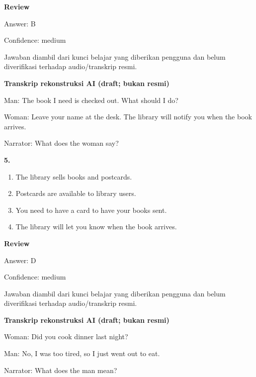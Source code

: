 \documentclass[12pt]{article}
\begin{document}
\par
\begingroup
\setlength{\parskip}{0pt}
\setlength{\parindent}{0pt}
\textbf{Review}\par
Answer: B\par
Confidence: medium\par
Jawaban diambil dari kunci belajar yang diberikan pengguna dan belum diverifikasi terhadap audio/transkrip resmi.\par
\endgroup
\par
\vspace{0.25\baselineskip}
\begin{exampleblock}
\textbf{Transkrip rekonstruksi AI (draft; bukan resmi)}\par
Man: The book I need is checked out. What should I do?\par
Woman: Leave your name at the desk. The library will notify you when the book arrives.\par
Narrator: What does the woman say?\par
\end{exampleblock}
\noindent\textbf{5.}
\begin{enumerate}[label=(\Alph*),leftmargin=*,itemsep=0.2em]
\item The library sells books and postcards.
\item Postcards are available to library users.
\item You need to have a card to have your books sent.
\item The library will let you know when the book arrives.
\end{enumerate}
\par
\begingroup
\setlength{\parskip}{0pt}
\setlength{\parindent}{0pt}
\textbf{Review}\par
Answer: D\par
Confidence: medium\par
Jawaban diambil dari kunci belajar yang diberikan pengguna dan belum diverifikasi terhadap audio/transkrip resmi.\par
\endgroup
\par
\vspace{0.25\baselineskip}
\begin{exampleblock}
\textbf{Transkrip rekonstruksi AI (draft; bukan resmi)}\par
Woman: Did you cook dinner last night?\par
Man: No, I was too tired, so I just went out to eat.\par
Narrator: What does the man mean?\par
\end{exampleblock}
\end{document}
